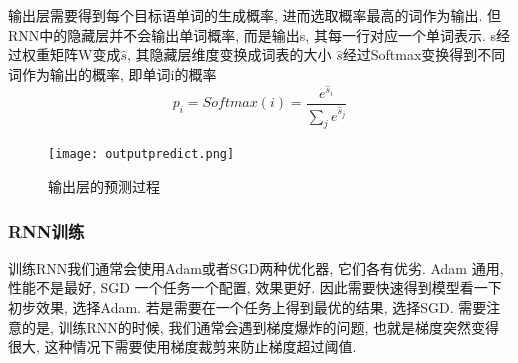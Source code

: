 输出层需要得到每个目标语单词的生成概率, 进而选取概率最高的词作为输出. 但RNN中的隐藏层并不会输出单词概率, 而是输出s, 其每一行对应一个单词表示.
s经过权重矩阵W变成$\hat{s}$, 其隐藏层维度变换成词表的大小
$\hat{s}$经过Softmax变换得到不同词作为输出的概率, 即单词i的概率
$$p_i= Softmax(i) = \frac{{e^{\hat{s}_i}}}{{\sum_j e^{\hat{s}_j}}}$$
 


    \begin{figure}[htp]
        \centering
        \texttt{[image: outputpredict.png]}
        \caption{输出层的预测过程} 
        \end{figure}

\subsubsection{RNN训练}
训练RNN我们通常会使用Adam或者SGD两种优化器, 它们各有优劣. Adam 通用, 性能不是最好, SGD  一个任务一个配置, 效果更好. 
因此需要快速得到模型看一下初步效果, 选择Adam. 
若是需要在一个任务上得到最优的结果, 选择SGD. 
需要注意的是, 训练RNN的时候, 我们通常会遇到梯度爆炸的问题, 也就是梯度突然变得很大, 这种情况下需要使用梯度裁剪来防止梯度超过阈值. 